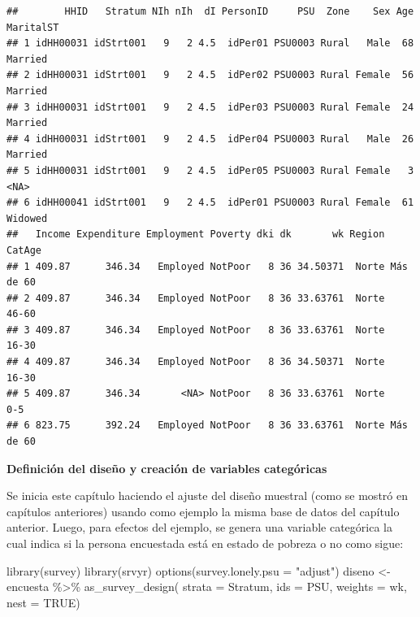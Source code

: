 \documentclass[
  12pt,
]{book}
\newenvironment{Shaded}{\begin{snugshade}}{\end{snugshade}}
\newcommand{\AttributeTok}[1]{\textcolor[rgb]{0.77,0.63,0.00}{#1}}
\newcommand{\ConstantTok}[1]{\textcolor[rgb]{0.00,0.00,0.00}{#1}}
\newcommand{\FunctionTok}[1]{\textcolor[rgb]{0.00,0.00,0.00}{#1}}
\newcommand{\NormalTok}[1]{#1}
\newcommand{\OtherTok}[1]{\textcolor[rgb]{0.56,0.35,0.01}{#1}}
\newcommand{\SpecialCharTok}[1]{\textcolor[rgb]{0.00,0.00,0.00}{#1}}
\newcommand{\StringTok}[1]{\textcolor[rgb]{0.31,0.60,0.02}{#1}}
\begin{document}
\begin{verbatim}
##        HHID   Stratum NIh nIh  dI PersonID     PSU  Zone    Sex Age MaritalST
## 1 idHH00031 idStrt001   9   2 4.5  idPer01 PSU0003 Rural   Male  68   Married
## 2 idHH00031 idStrt001   9   2 4.5  idPer02 PSU0003 Rural Female  56   Married
## 3 idHH00031 idStrt001   9   2 4.5  idPer03 PSU0003 Rural Female  24   Married
## 4 idHH00031 idStrt001   9   2 4.5  idPer04 PSU0003 Rural   Male  26   Married
## 5 idHH00031 idStrt001   9   2 4.5  idPer05 PSU0003 Rural Female   3      <NA>
## 6 idHH00041 idStrt001   9   2 4.5  idPer01 PSU0003 Rural Female  61   Widowed
##   Income Expenditure Employment Poverty dki dk       wk Region    CatAge
## 1 409.87      346.34   Employed NotPoor   8 36 34.50371  Norte Más de 60
## 2 409.87      346.34   Employed NotPoor   8 36 33.63761  Norte     46-60
## 3 409.87      346.34   Employed NotPoor   8 36 33.63761  Norte     16-30
## 4 409.87      346.34   Employed NotPoor   8 36 34.50371  Norte     16-30
## 5 409.87      346.34       <NA> NotPoor   8 36 33.63761  Norte       0-5
## 6 823.75      392.24   Employed NotPoor   8 36 33.63761  Norte Más de 60
\end{verbatim}

\textbf{Definición del diseño y creación de variables categóricas}

Se inicia este capítulo haciendo el ajuste del diseño muestral (como se mostró en capítulos anteriores) usando como ejemplo la misma base de datos del capítulo anterior. Luego, para efectos del ejemplo, se genera una variable categórica la cual indica si la persona encuestada está en estado de pobreza o no como sigue:

\begin{Shaded}
\begin{Highlighting}[]
\FunctionTok{library}\NormalTok{(survey)}
\FunctionTok{library}\NormalTok{(srvyr)}
\FunctionTok{options}\NormalTok{(}\AttributeTok{survey.lonely.psu =} \StringTok{"adjust"}\NormalTok{)}
\NormalTok{diseno }\OtherTok{\textless{}{-}}\NormalTok{ encuesta }\SpecialCharTok{\%\textgreater{}\%} 
          \FunctionTok{as\_survey\_design}\NormalTok{(}
                           \AttributeTok{strata =}\NormalTok{ Stratum,  }
                           \AttributeTok{ids =}\NormalTok{ PSU,         }
                           \AttributeTok{weights =}\NormalTok{ wk,      }
                           \AttributeTok{nest =} \ConstantTok{TRUE}\NormalTok{)}
\end{Highlighting}
\end{Shaded}
\end{document}
